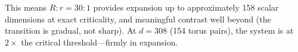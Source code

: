 \begin{remark}
This means $R{:}r = 30{:}1$ provides expansion up to approximately 158 scalar dimensions at exact criticality, and meaningful contrast well beyond (the transition is gradual, not sharp). At $d = 308$ (154 torus pairs), the system is at $2\times$ the critical threshold---firmly in expansion.
\end{remark}
